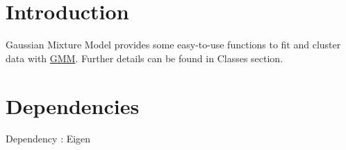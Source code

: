 \hypertarget{index_intro_sec}{}\section{Introduction}\label{index_intro_sec}
Gaussian Mixture Model provides some easy-\/to-\/use functions to fit and cluster data with \hyperlink{class_g_m_m}{G\+M\+M}. Further details can be found in Classes section.\hypertarget{index_depend_sec}{}\section{Dependencies}\label{index_depend_sec}
Dependency \+: Eigen 